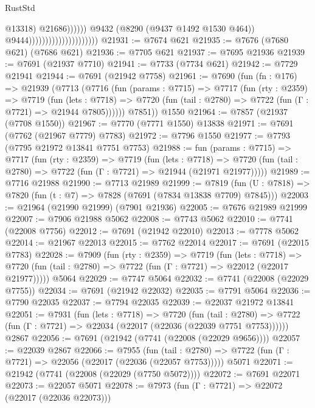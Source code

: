 \begin{lexlean}{RustStd}
\begin{coremodule}
                                                            @13318)
                                                          @21686))))))
                                              @9432
                                              (@8290 (@9437 @1492 @1530 @464))
                                              @9444)))))))))))))))))))))
@21931 := @7674 @621
@21935 := @7676 (@7680 @621) (@7686 @621)
@21936 := @7705 @621
@21937 := @7695 @21936
@21939 := @7691 (@21937 @7710)
@21941 := @7733 (@7734 @621)
@21942 := @7729 @21941
@21944 := @7691 (@21942 @7758)
@21961 := @7690
    (fun (fn : @176) =>
    @21939
      (@7713
        (@7716
          (fun (params : @7715) =>
          @7717
            (fun (rty : @2359) =>
            @7719
              (fun (lets : @7718) =>
              @7720 (fun (tail : @2780) => @7722 (fun (Γ : @7721) => @21944 @7805))))))
        @7851))
    @1550
@21964 := @7857 (@21937 (@7708 @1550))
@21967 := @7770 (@7771 @1550) @13838
@21971 := @7691 (@7762 (@21967 @7779) @7783)
@21972 := @7796 @1550
@21977 := @7793 (@7795 @21972 @13841 @7751 @7753)
@21988 := fun (params : @7715) =>
  @7717
    (fun (rty : @2359) =>
    @7719
      (fun (lets : @7718) =>
      @7720 (fun (tail : @2780) => @7722 (fun (Γ : @7721) => @21944 (@21971 @21977)))))
@21989 := @7716 @21988
@21990 := @7713 @21989
@21999 := @7819
    (fun (U : @7818) => @7820 (fun (t : @7) => @7828 (@7691 (@7834 @13838 @7709) @7845)))
@22003 := @21964 (@21990 @21999) (@7901 @21936)
@22005 := @7676 @21989 @21999
@22007 := @7906 @21988 @5062
@22008 := @7743 @5062
@22010 := @7741 (@22008 @7756)
@22012 := @7691 (@21942 @22010)
@22013 := @7778 @5062
@22014 := @21967 @22013
@22015 := @7762 @22014
@22017 := @7691 (@22015 @7783)
@22028 := @7909
    (fun (rty : @2359) =>
    @7719
      (fun (lets : @7718) =>
      @7720 (fun (tail : @2780) => @7722 (fun (Γ : @7721) => @22012 (@22017 @21977)))))
    @5064
@22029 := @7747 @5064
@22032 := @7741 (@22008 (@22029 @7755))
@22034 := @7691 (@21942 @22032)
@22035 := @7791 @5064
@22036 := @7790 @22035
@22037 := @7794 @22035
@22039 := @22037 @21972 @13841
@22051 := @7931
    (fun (lets : @7718) =>
    @7720
      (fun (tail : @2780) =>
      @7722 (fun (Γ : @7721) => @22034 (@22017 (@22036 (@22039 @7751 @7753))))))
    @2867
@22056 := @7691 (@21942 (@7741 (@22008 (@22029 @9656))))
@22057 := @22039 @2867
@22066 := @7955
    (fun (tail : @2780) => @7722 (fun (Γ : @7721) => @22056 (@22017 (@22036 (@22057 @7753)))))
    @5071
@22071 := @21942 (@7741 (@22008 (@22029 (@7750 @5072))))
@22072 := @7691 @22071
@22073 := @22057 @5071
@22078 := @7973 (fun (Γ : @7721) => @22072 (@22017 (@22036 @22073)))

\end{coremodule}
\end{lexlean}
